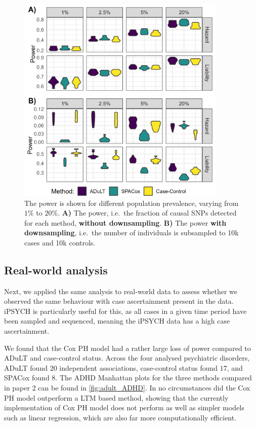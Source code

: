 \begin{figure}[h]
	\centering
	\includegraphics[width=10cm]{results/adult_combined_C250_power}
	\caption[Power simulation results with $ 250 $ causal SNPs under both generative models and varying prevalences.]{The power is shown for different population prevalence, varying from $ 1\% $ to $ 20\% $. \textbf{A)} The power, i.e.\ the fraction of causal SNPs detected for each method, \textbf{without downsampling}. \textbf{B)} The power \textbf{with downsampling}, i.e.\ the number of individuals is subsampled to 10k cases and 10k controls.}
	\label{fig:adult_simulations}
\end{figure}


\subsection{Real-world analysis}
Next, we applied the same analysis to real-world data to assess whether we observed the same behaviour with case ascertainment present in the data. iPSYCH is particularly useful for this, as all cases in a given time period have been sampled and sequenced, meaning the iPSYCH data has a high case ascertainment.

We found that the Cox PH model had a rather large loss of power compared to ADuLT and case-control status. Across the four analysed psychiatric disorders, ADuLT found $ 20 $ independent associations, case-control status found $ 17 $, and SPACox found $ 8 $. The ADHD Manhattan plots for the three methods compared in paper 2 can be found in \cref{fig:adult_ADHD}. In no circumstances did the Cox PH model outperform a LTM based method, showing that the currently implementation of Cox PH model does not perform as well as simpler models such as linear regression, which are also far more computationally efficient.

